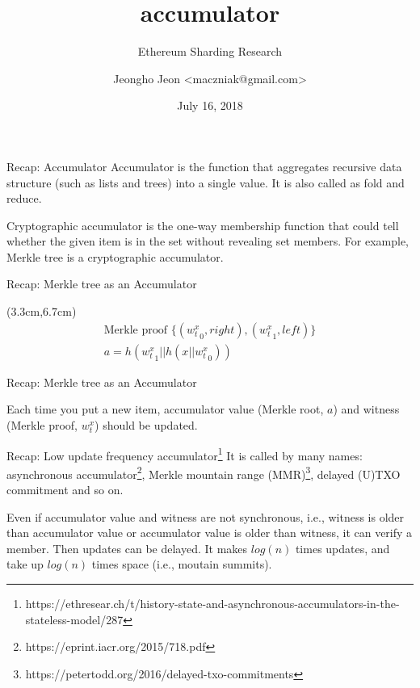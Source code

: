 \documentclass{beamer}
\title{accumulator}
\subtitle{Ethereum Sharding Research}
\date{July 16, 2018}
\author{Jeongho Jeon <maczniak@gmail.com>}
\institute{\textbf{Whitepaper} Foundation, Nonce\\%
(for internal discussion purposes only)}
\begin{document}
\maketitle

\begin{frame}{Recap: Accumulator}
Accumulator is the function that aggregates recursive data structure (such as lists and trees) into a single value. It is also called as fold and reduce.

Cryptographic accumulator is the one-way membership function that could tell whether the given item is in the set without revealing set members. For example, Merkle tree is a cryptographic accumulator.
\end{frame}

\begin{frame}{Recap: Merkle tree as an Accumulator}
\begin{center}

\end{center}

\begin{textblock*}{5cm}(3.3cm,6.7cm)
\begin{gather*}
\textrm{Merkle proof } \{ ({w^x_t}_0, right), ({w^x_t}_1, left) \} \\
a = h({w^x_t}_1 || h(x || {w^x_t}_0))
\end{gather*}
\end{textblock*}
\end{frame}

\begin{frame}{Recap: Merkle tree as an Accumulator}
\begin{center}

\end{center}

Each time you put a new item, accumulator value (Merkle root, $a$) and witness (Merkle proof, $w^x_t$)
should be updated.
\end{frame}

\begin{frame}{Recap: Low update frequency accumulator\footnote{https://ethresear.ch/t/history-state-and-asynchronous-accumulators-in-the-stateless-model/287}}
It is called by many names: asynchronous accumulator\footnote{https://eprint.iacr.org/2015/718.pdf},
Merkle mountain range (MMR)\footnote{https://petertodd.org/2016/delayed-txo-commitments}, delayed (U)TXO commitment and so on.

Even if accumulator value and witness are not synchronous, i.e.,
witness is older than accumulator value or
accumulator value is older than witness,
it can verify a member. Then updates can be delayed.
It makes $log(n)$ times updates, and take up $log(n)$ times space (i.e., moutain summits).
\end{frame}
\end{document}
